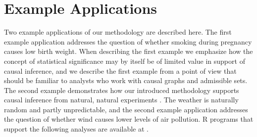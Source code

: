 \documentclass[11pt]{amsart}
\begin{document}
\section{Example Applications}
\label{application}
Two example applications of our methodology are described here. The first example application addresses the question of whether smoking during pregnancy causes low birth weight. When describing the first example we emphasize how the concept of statistical significance may by itself be of limited value in support of causal inference, and we describe the first example from a point of view that should be familiar to analysts who work with causal graphs and admissible sets. The second example demonstrates how our introduced methodology supports causal inference from natural, natural experiments \citep{Rosen}. The weather is naturally random and partly unpredictable, and the second example application addresses the question of whether wind causes lower levels of air pollution. R programs that support the following analyses are available at \cite{Hughes25}.
\end{document}
